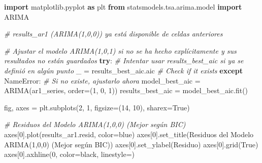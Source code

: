 \documentclass[
  11pt,
]{article}
\newenvironment{Shaded}{}{}
\newcommand{\CommentTok}[1]{\textcolor[rgb]{0.38,0.63,0.69}{\textit{#1}}}
\newcommand{\ControlFlowTok}[1]{\textcolor[rgb]{0.00,0.44,0.13}{\textbf{#1}}}
\newcommand{\DecValTok}[1]{\textcolor[rgb]{0.25,0.63,0.44}{#1}}
\newcommand{\ImportTok}[1]{\textcolor[rgb]{0.00,0.50,0.00}{\textbf{#1}}}
\newcommand{\NormalTok}[1]{#1}
\newcommand{\OperatorTok}[1]{\textcolor[rgb]{0.40,0.40,0.40}{#1}}
\newcommand{\PreprocessorTok}[1]{\textcolor[rgb]{0.74,0.48,0.00}{#1}}
\newcommand{\StringTok}[1]{\textcolor[rgb]{0.25,0.44,0.63}{#1}}
\newcommand{\VariableTok}[1]{\textcolor[rgb]{0.10,0.09,0.49}{#1}}
\begin{document}
\begin{Shaded}
\begin{Highlighting}[]
\ImportTok{import}\NormalTok{ matplotlib.pyplot }\ImportTok{as}\NormalTok{ plt}
\ImportTok{from}\NormalTok{ statsmodels.tsa.arima.model }\ImportTok{import}\NormalTok{ ARIMA}

\CommentTok{\# results\_ar1 (ARIMA(1,0,0)) ya está disponible de celdas anteriores}

\CommentTok{\# Ajustar el modelo ARIMA(1,0,1) si no se ha hecho explícitamente y sus resultados no están guardados}
\ControlFlowTok{try}\NormalTok{:}
    \CommentTok{\# Intentar usar results\_best\_aic si ya se definió en algún punto}
\NormalTok{    \_ }\OperatorTok{=}\NormalTok{ results\_best\_aic.aic }\CommentTok{\# Check if it exists}
\ControlFlowTok{except} \PreprocessorTok{NameError}\NormalTok{:}
    \CommentTok{\# Si no existe, ajustarlo ahora}
\NormalTok{    model\_best\_aic }\OperatorTok{=}\NormalTok{ ARIMA(ar1\_series, order}\OperatorTok{=}\NormalTok{(}\DecValTok{1}\NormalTok{, }\DecValTok{0}\NormalTok{, }\DecValTok{1}\NormalTok{))}
\NormalTok{    results\_best\_aic }\OperatorTok{=}\NormalTok{ model\_best\_aic.fit()}

\NormalTok{fig, axes }\OperatorTok{=}\NormalTok{ plt.subplots(}\DecValTok{2}\NormalTok{, }\DecValTok{1}\NormalTok{, figsize}\OperatorTok{=}\NormalTok{(}\DecValTok{14}\NormalTok{, }\DecValTok{10}\NormalTok{), sharex}\OperatorTok{=}\VariableTok{True}\NormalTok{)}

\CommentTok{\# Residuos del Modelo ARIMA(1,0,0) (Mejor según BIC)}
\NormalTok{axes[}\DecValTok{0}\NormalTok{].plot(results\_ar1.resid, color}\OperatorTok{=}\StringTok{\textquotesingle{}blue\textquotesingle{}}\NormalTok{)}
\NormalTok{axes[}\DecValTok{0}\NormalTok{].set\_title(}\StringTok{\textquotesingle{}Residuos del Modelo ARIMA(1,0,0) (Mejor según BIC)\textquotesingle{}}\NormalTok{)}
\NormalTok{axes[}\DecValTok{0}\NormalTok{].set\_ylabel(}\StringTok{\textquotesingle{}Residuo\textquotesingle{}}\NormalTok{)}
\NormalTok{axes[}\DecValTok{0}\NormalTok{].grid(}\VariableTok{True}\NormalTok{)}
\NormalTok{axes[}\DecValTok{0}\NormalTok{].axhline(}\DecValTok{0}\NormalTok{, color}\OperatorTok{=}\StringTok{\textquotesingle{}black\textquotesingle{}}\NormalTok{, linestyle}\OperatorTok{=}\StringTok{\textquotesingle{}{-}{-}\textquotesingle{}}\NormalTok{)}


\end{Highlighting}
\end{Shaded}
\end{document}
